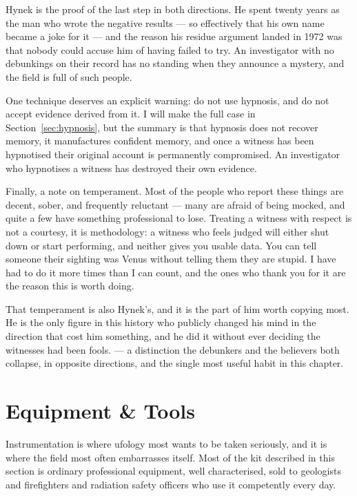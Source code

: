 Hynek is the proof of the last step in both directions. He spent twenty years as the man who
wrote the negative results --- so effectively that his own name became a joke for it --- and the
reason his residue argument landed in 1972 was that nobody could accuse him of having failed to
try.  An investigator with no debunkings on their record has no
standing when they announce a mystery, and the field is full of such people.

One technique deserves an explicit warning: do not use hypnosis, and do not accept evidence
derived from it. I will make the full case in Section~\ref{sec:hypnosis}, but the summary
is that hypnosis does not recover memory, it manufactures confident memory, and once a
witness has been hypnotised their original account is permanently compromised. An
investigator who hypnotises a witness has destroyed their own evidence.

Finally, a note on temperament. Most of the people who report these things are decent,
sober, and frequently reluctant --- many are afraid of being mocked, and quite a few have
something professional to lose. Treating a witness with respect is not a courtesy, it is
methodology: a witness who feels judged will either shut down or start performing, and
neither gives you usable data. You can tell someone their sighting was Venus without
telling them they are stupid. I have had to do it more times than I can count, and the ones
who thank you for it are the reason this is worth doing.

That temperament is also Hynek's, and it is the part of him worth copying most. He is the only
figure in this history who publicly changed his mind in the direction that cost him something,
and he did it without ever deciding the witnesses had been fools.  --- a distinction the debunkers and the believers both
collapse, in opposite directions, and the single most useful habit in this chapter.

\section{Equipment \& Tools}\label{sec:equipmenttools}
\label{sec:equipment}

Instrumentation is where ufology most wants to be taken seriously, and it is where the field
most often embarrasses itself. Most of the
kit described in this section is ordinary professional equipment, well characterised, sold to
geologists and firefighters and radiation safety officers who use it competently every day.

